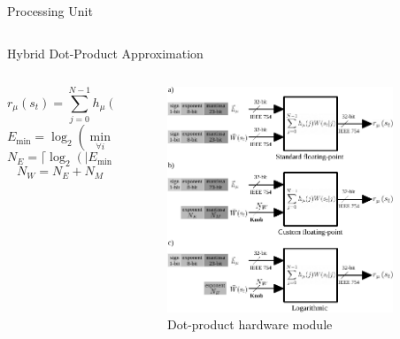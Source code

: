 \begin{frame}{Processing Unit}
\begin{columns}[c]
	\end{columns}
\end{frame}

\begin{frame}{Hybrid Dot-Product Approximation}
	\begin{columns}[c] %
		\begin{column}{0.5\textwidth}

			\begin{equation}
			r_{\mu}\left(s_t\right)=\sum_{j=0}^{N-1}h_{\mu}(j)W(s_t|j)
			\end{equation}
			\vspace{5mm} 
			\begin{equation}
			E_{\min}=\log _2(\min_{\forall i}(W(i)))
			\end{equation}
			\vspace{5mm} 
			\begin{equation}
			N_E=\lceil\log_2(|E_{\min}|)\rceil
			\end{equation}
			\vspace{5mm} 
			\begin{equation}
			N_W=N_E + N_M
			\end{equation}
		\end{column}
		
		\begin{column}{0.5\textwidth}
			\begin{figure}
				\centering
				\includegraphics[width=0.9\textwidth]{../chapters/sbs_accelerator/figures/dot-product_unit.pdf} %
				\caption{Dot-product hardware module}
			\end{figure}
		\end{column}
	\end{columns}
\end{frame}

